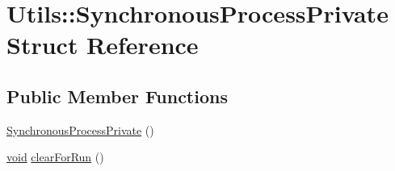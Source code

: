 \hypertarget{struct_utils_1_1_synchronous_process_private}{\section{Utils\-:\-:Synchronous\-Process\-Private Struct Reference}
\label{struct_utils_1_1_synchronous_process_private}
}
\subsection*{Public Member Functions}
\begin{DoxyCompactItemize}
\item 
\hyperlink{struct_utils_1_1_synchronous_process_private_a509d0e3bb1a797c969a42ae9cd4f1c83}{Synchronous\-Process\-Private} ()
\item 
\hyperlink{group___u_a_v_objects_plugin_ga444cf2ff3f0ecbe028adce838d373f5c}{void} \hyperlink{struct_utils_1_1_synchronous_process_private_a174a7b27f71f0f674c55c565c414b58a}{clear\-For\-Run} ()
\end{DoxyCompactItemize}
